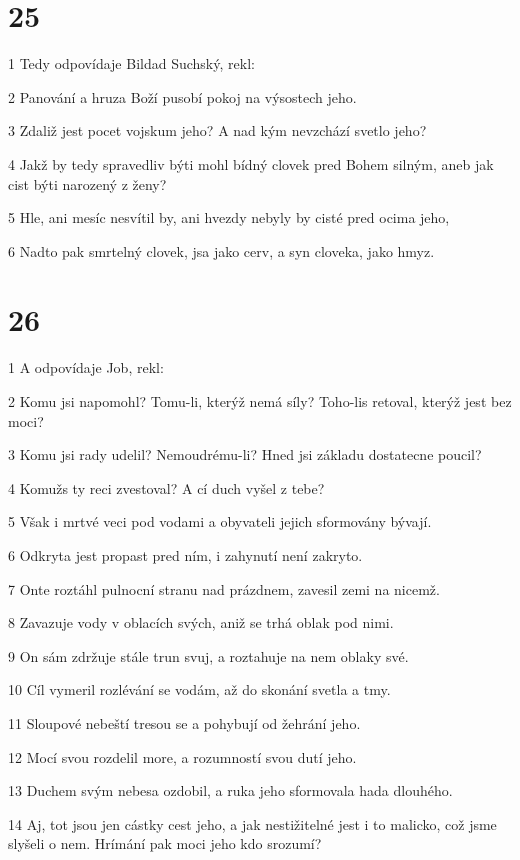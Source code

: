 \chapter{25}

\par 1 Tedy odpovídaje Bildad Suchský, rekl:
\par 2 Panování a hruza Boží pusobí pokoj na výsostech jeho.
\par 3 Zdaliž jest pocet vojskum jeho? A nad kým nevzchází svetlo jeho?
\par 4 Jakž by tedy spravedliv býti mohl bídný clovek pred Bohem silným, aneb jak cist býti narozený z ženy?
\par 5 Hle, ani mesíc nesvítil by, ani hvezdy nebyly by cisté pred ocima jeho,
\par 6 Nadto pak smrtelný clovek, jsa jako cerv, a syn cloveka, jako hmyz.

\chapter{26}

\par 1 A odpovídaje Job, rekl:
\par 2 Komu jsi napomohl? Tomu-li, kterýž nemá síly? Toho-lis retoval, kterýž jest bez moci?
\par 3 Komu jsi rady udelil? Nemoudrému-li? Hned jsi základu dostatecne poucil?
\par 4 Komužs ty reci zvestoval? A cí duch vyšel z tebe?
\par 5 Však i mrtvé veci pod vodami a obyvateli jejich sformovány bývají.
\par 6 Odkryta jest propast pred ním, i zahynutí není zakryto.
\par 7 Onte roztáhl pulnocní stranu nad prázdnem, zavesil zemi na nicemž.
\par 8 Zavazuje vody v oblacích svých, aniž se trhá oblak pod nimi.
\par 9 On sám zdržuje stále trun svuj, a roztahuje na nem oblaky své.
\par 10 Cíl vymeril rozlévání se vodám, až do skonání svetla a tmy.
\par 11 Sloupové nebeští tresou se a pohybují od žehrání jeho.
\par 12 Mocí svou rozdelil more, a rozumností svou dutí jeho.
\par 13 Duchem svým nebesa ozdobil, a ruka jeho sformovala hada dlouhého.
\par 14 Aj, tot jsou jen cástky cest jeho, a jak nestižitelné jest i to malicko, což jsme slyšeli o nem. Hrímání pak moci jeho kdo srozumí?

